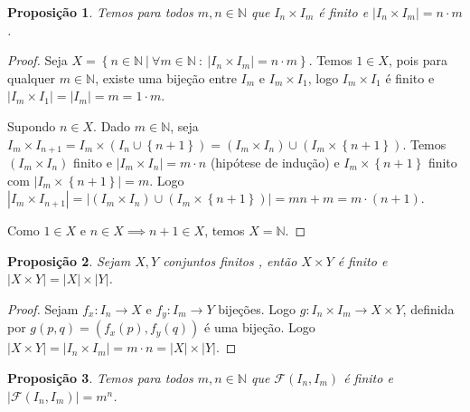 \documentclass{article}
\newtheorem{prop}{Proposição}[section]
\theoremstyle{theorem}
\theoremstyle{lemma}
\theoremstyle{definition}
\theoremstyle{remark}
\begin{document}
\begin{prop}
	Temos para todos $m,n\in \mathbb{N}$ que $I_n\times I_m$ é finito e $|I_n\times I_m| = n\cdot m$.
\end{prop}
\begin{proof}
	Seja $X = \left\{ n \in \mathbb{N} \: | \: \forall m\in \mathbb{N} \: : \: |I_n \times I_m| = n\cdot m \right\}$.  Temos $1\in X$, pois para qualquer $m\in \mathbb{N}$, existe uma bijeção entre $I_m$ e $I_m\times I_1$, logo $I_m\times I_1$ é finito e  $|I_m\times I_1| = |I_m| = m = 1\cdot m$.


	Supondo $n \in X$. Dado $m\in \mathbb{N}$, seja $ I_m \times I_{n+1} = I_m\times \left( I_n \cup \left\{n+1\right\} \right) = (I_m \times I_n) \cup \left( I_m \times \left\{ n+1\right\}\right)$. Temos $(I_m \times I_n)$ finito e $|I_m \times I_n| = m\cdot n$ (hipótese de indução) e $I_m\times \left\{n+1\right\}$ finito com  $|I_m\times \left\{n+1\right\}| = m$. Logo $| I_m \times I_{n+1}  |=| (I_m \times I_n) \cup \left( I_m \times \left\{ n+1\right\}\right)| = mn + m = m\cdot(n+1)$.

	Como $1\in X$ e $n\in X \implies n+1\in X$, temos $X = \mathbb{N}$.
\end{proof}
\begin{prop}
	Sejam $X,Y$ conjuntos finitos , então $X\times  Y$ é finito e $|X\times Y| = |X| \times |Y|$.
\end{prop}
\begin{proof}
	Sejam $f_x : I_n \to X$ e $f_y : I_m \to Y$ bijeções. Logo $g: I_n \times I_m \to X\times Y$, definida por $g(p,q) = (f_x(p), f_y(q))$ é uma bijeção. Logo $|X\times Y| = |I_n\times I_m| = m\cdot n = |X| \times |Y|$.
		
\end{proof}
\begin{prop}
	Temos para todos $m,n\in \mathbb{N}$ que $\mathcal{F}(I_n, I_m)$ é finito e $|\mathcal{F}(I_n, I_m)| = m^n$.
\end{prop}
\end{document}
